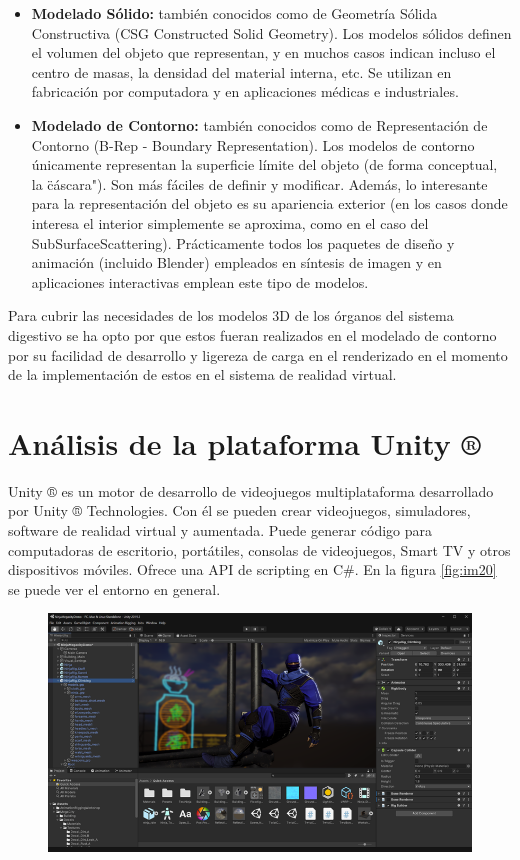 \begin{itemize}
\item \textbf{Modelado Sólido:} también conocidos como de Geometría Sólida Constructiva (CSG Constructed Solid Geometry). Los modelos sólidos definen el volumen 
del objeto que representan, y en muchos casos indican incluso el centro de masas, la densidad del material interna, etc. Se utilizan en fabricación por computadora 
y en aplicaciones médicas e industriales.
\item \textbf{Modelado de Contorno:} también conocidos como de Representación de Contorno (B-Rep - Boundary Representation). Los modelos de contorno únicamente 
representan la superficie límite del objeto (de forma conceptual, la \"cáscara"). Son más fáciles de definir y modificar. Además, lo interesante para la representación 
del objeto es su apariencia exterior (en los casos donde interesa el interior simplemente se aproxima, como en el caso del SubSurfaceScattering). Prácticamente todos 
los paquetes de diseño y animación (incluido Blender) empleados en síntesis de imagen y en aplicaciones interactivas emplean este tipo de modelos.
\end{itemize}
Para  cubrir las necesidades de los modelos 3D de los órganos del sistema digestivo se ha opto por que estos fueran realizados en el 
modelado de contorno por su facilidad de desarrollo y ligereza de carga en el renderizado en el momento de la implementación de estos 
en el sistema de realidad virtual.\\

\section{Análisis de la plataforma Unity ®}
Unity ® es un motor de desarrollo de videojuegos multiplataforma desarrollado por Unity ® Technologies. Con él se pueden crear videojuegos, simuladores, 
software de realidad virtual y aumentada. Puede generar código para computadoras de escritorio, portátiles, consolas de videojuegos, Smart TV y otros dispositivos móviles. 
Ofrece una API de scripting en C\#. En la figura \ref{fig:im20} se puede ver el entorno en general.\\
\begin{figure}[H]
	\begin{center}
 		\includegraphics[width = .5\textwidth]{source/images/image33.png}
	\end{center} 
\end{figure}
